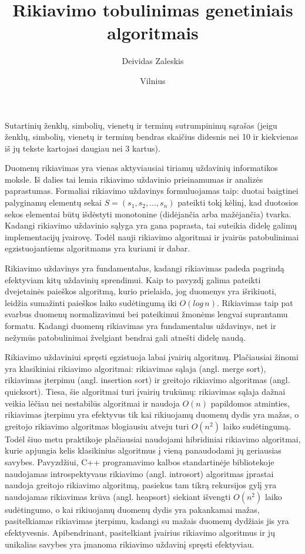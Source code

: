 \documentclass{VUMIFInfBakalaurinis}
\institute{Informatikos institutas}
\title{Rikiavimo tobulinimas genetiniais algoritmais}
\author{Deividas Zaleskis}
\date{Vilnius \\ \the\year}
\begin{document}
\maketitle

\tableofcontents


Sutartinių ženklų, simbolių, vienetų ir terminų sutrumpinimų sąrašas (jeigu
ženklų, simbolių, vienetų ir terminų bendras skaičius didesnis nei 10 ir
kiekvienas iš jų tekste kartojasi daugiau nei 3 kartus).


Duomenų rikiavimas yra vienas aktyviausiai tiriamų uždavinių informatikos moksle.
Iš dalies tai lemia rikiavimo uždavinio prieinamumas ir analizės paprastumas.
Formaliai rikiavimo uždavinys formuluojamas taip:
duotai baigtinei palyginamų elementų sekai $S = (s_1, s_2, ..., s_n)$ pateikti tokį
kėlinį, kad duotosios sekos elementai būtų išdėstyti monotonine (didėjančia arba mažėjančia) tvarka.
Kadangi rikiavimo uždavinio sąlyga yra gana paprasta, tai suteikia didelę galimų implementacijų įvairovę.
Todėl nauji rikiavimo algoritmai ir įvairūs patobulinimai egzistuojantiems algoritmams yra kuriami ir dabar.

Rikiavimo uždavinys yra fundamentalus, kadangi rikiavimas padeda pagrindą efektyviam kitų uždavinių sprendimui.
Kaip to pavyzdį galima pateikti dvejetainės paieškos algoritmą, kurio prielaida,
jog duomenys yra išrikiuoti, leidžia sumažinti paieškos laiko sudėtingumą iki $O(log\,n)$.
Rikiavimas taip pat svarbus duomenų normalizavimui bei pateikimui žmonėms lengvai suprantamu formatu.
Kadangi duomenų rikiavimas yra fundamentalus uždavinys, net ir nežymūs patobulinimai žvelgiant bendrai
gali atnešti didelę naudą.

Rikiavimo uždaviniui spręsti egzistuoja labai įvairių algoritmų.
Plačiausiai žinomi yra klasikiniai rikiavimo algoritmai: rikiavimas sąlaja (angl. merge sort), rikiavimas įterpimu (angl. insertion sort) ir greitojo rikiavimo algoritmas (angl. quicksort).
Tiesa, šie algoritmai turi įvairių trukūmų:
rikiavimas sąlaja dažnai veikia lėčiau nei nestabilūs algoritmai ir naudoja $O(n)$ papildomos atminties, rikiavimas įterpimu yra efektyvus tik kai rikiuojamų duomenų dydis yra mažas, o
greitojo rikiavimo algoritmas blogiausiu atveju turi $O(n^2)$ laiko sudėtingumą.
Todėl šiuo metu praktikoje plačiausiai naudojami hibridiniai rikiavimo algoritmai, kurie apjungia kelis klasikinius algoritmus į vieną panaudodami jų geriausias savybes.
Pavyzdžiui, C++ programavimo kalbos standartinėje bibliotekoje naudojamas introspektyvaus rikiavimo (angl. introsort) algoritmas įprastai naudoja greitojo rikiavimo algoritmą,
pasiekus tam tikrą rekursijos gylį yra naudojamas rikiavimas krūva (angl. heapsort) siekiant išvengti $O(n^2)$ laiko sudėtingumo,
o kai rikiuojamų duomenų dydis yra pakankamai mažas, pasitelkiamas rikiavimas įterpimu, kadangi su mažais duomenų dydžiais jis yra efektyvesnis.
Apibendrinant, pasitelkiant įvairius rikiavimo algoritmus ir jų unikalias savybes yra įmanoma rikiavimo uždavinį spręsti efektyviau.
\end{document}
